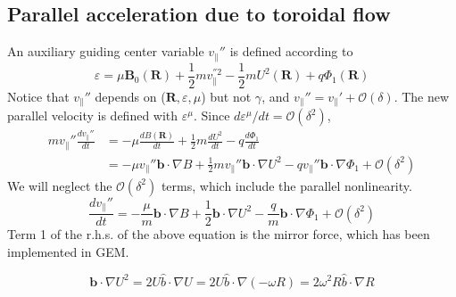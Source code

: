 \documentclass[12pt]{article}
\begin{document}
\begin{CJK*}{UTF8}{gbsn}
\section{Parallel acceleration due to toroidal flow}
An auxiliary guiding center variable $v_{\parallel}{''}$ is defined according to 
\begin{equation}
    \varepsilon = \mu\mathbf{B_\mathrm{0}(R)} + \frac{1}{2}mv_{\parallel}^{''2} - \frac{1}{2}mU^2\mathbf{(R)} + q\Phi_1\mathbf{(R)}
\end{equation}
Notice that $v_{\parallel}{''}$ depends on ($\mathbf{R},\varepsilon,\mu$) but not $\gamma$, and $v_{\parallel}{''}=v_{\parallel}{'}+\mathcal{O}(\delta)$.
The new parallel velocity is defined with $\varepsilon^{\mu}$. Since $d\varepsilon^{\mu}/dt=\mathcal{O}(\delta^2)$,
\begin{equation}
\begin{split}
    mv_{\parallel}''\frac{dv_{\parallel}''}{dt} &= -\mu\frac{dB\mathbf{(R)}}{dt} + \frac{1}{2}m\frac{dU^2}{dt} - q\frac{d\Phi_1}{dt}\\
    &=-\mu v_{\parallel}''\mathbf{b}\cdot\nabla B + \frac{1}{2}mv_{\parallel}''\mathbf{b}\cdot\nabla U^2 - qv_{\parallel}''
    \mathbf{b}\cdot\nabla\Phi_1 + \mathcal{O}(\delta^2)
\end{split}
\end{equation}
We will neglect the $\mathcal{O}(\delta^2)$ terms, which include the parallel nonlinearity.
\begin{equation}
    \frac{dv_{\parallel}''}{dt} = -\frac{\mu}{m}\mathbf{b}\cdot\nabla B + \frac{1}{2}\mathbf{b}\cdot\nabla U^2 - \frac{q}{m}\mathbf{b}\cdot\nabla\Phi_1 + \mathcal{O}(\delta^2)
\end{equation}
Term 1 of the r.h.s. of the above equation is the mirror force, which has been implemented in GEM.

\begin{equation}
    \mathbf{b}\cdot\nabla U^2=2U\hat{b}\cdot\nabla U=2U\hat{b}\cdot\nabla(-\omega R)=2\omega^2R\hat{b}\cdot\nabla R
\end{equation}


\end{CJK*}
\end{document}
